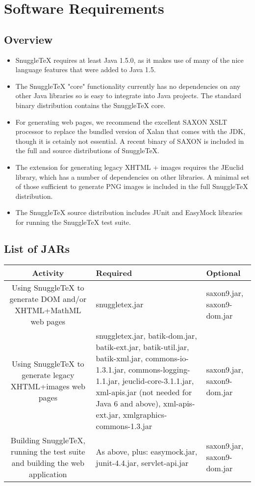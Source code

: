 
\section*{Software Requirements}

\subsection*{Overview}

\begin{itemize}

  \item SnuggleTeX requires at least Java 1.5.0, as it makes use of many of the
        nice language features that were added to Java 1.5.

  \item The SnuggleTeX "core" functionality currently has no dependencies on
        any other Java libraries so is easy to integrate into Java projects. The
        standard binary distribution contains the SnuggleTeX core.

  \item For generating web pages, we recommend the excellent SAXON XSLT processor
        to replace the bundled version of Xalan that comes with the JDK, though
        it is cetainly not essential. A recent binary of SAXON is included in
        the full and source distributions of SnuggleTeX.

  \item The extension for generating legacy XHTML + images requires the
        JEuclid library, which has a number of dependencies on other
        libraries. A minimal set of those sufficient to generate PNG images is
        included in the full SnuggleTeX distribution.

  \item The SnuggleTeX source distribution includes JUnit and EasyMock libraries
        for running the SnuggleTeX test suite.

\end{itemize}

\subsection*{List of JARs}

\begin{tabular}{|c|l|l|}
\hline
Activity &
Required &
Optional \\
\hline
Using SnuggleTeX to generate DOM and/or XHTML+MathML web pages &
snuggletex.jar &
saxon9.jar, saxon9-dom.jar \\
\hline
Using SnuggleTeX to generate legacy XHTML+images web pages &
snuggletex.jar, batik-dom.jar, batik-ext.jar, batik-util.jar, batik-xml.jar, commons-io-1.3.1.jar, %
commons-logging-1.1.jar, jeuclid-core-3.1.1.jar, xml-apis.jar (not needed for Java 6 and above), %
 xml-apis-ext.jar, xmlgraphics-commons-1.3.jar &
saxon9.jar, saxon9-dom.jar \\
\hline
Building SnuggleTeX, running the test suite and building the web application &
As above, plus: easymock.jar, junit-4.4.jar, servlet-api.jar &
saxon9.jar, saxon9-dom.jar \\
\hline
\end{tabular}
